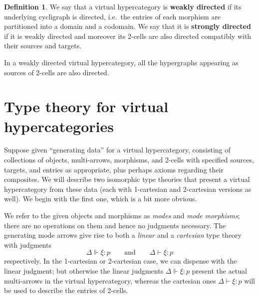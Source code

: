 \documentclass{article}
\theoremstyle{definition}
\newtheorem{defn}[thm]{Definition}
\theoremstyle{remark}
\let\types\vdash
\let\Types\Vdash
\begin{document}
\begin{defn}
  We say that a virtual hypercategory is \textbf{weakly directed} if its underlying cycligraph is directed, i.e.\ the entries of each morphism are partitioned into a domain and a codomain.
  We say that it is \textbf{strongly directed} if it is weakly directed and moreover its 2-cells are also directed compatibly with their sources and targets.
\end{defn}

In a weakly directed virtual hypercategory, all the hypergraphs appearing as sources of 2-cells are also directed.




\section{Type theory for virtual hypercategories}
\label{sec:type-theory}

Suppose given ``generating data'' for a virtual hypercategory, consisting of collections of objects, multi-arrows, morphisms, and 2-cells with specified sources, targets, and entries as appropriate, plus perhaps axioms regarding their composites.
We will describe two isomorphic type theories that present a virtual hypercategory from these data (each with 1-cartesian and 2-cartesian versions as well).
We begin with the first one, which is a bit more obvious.

We refer to the given objects and morphisms as \emph{modes} and \emph{mode morphisms}; there are no operations on them and hence no judgments necessary.
The generating mode arrows give rise to both a \emph{linear} and a \emph{cartesian} type theory with judgments
\[ \Delta \Types \xi:p \qquad\text{and}\qquad \Delta \types \xi:p \]
respectively.
In the 1-cartesian or 2-cartesian case, we can dispense with the linear judgment; but otherwise the linear judgments $\Delta \Types \xi:p$ present the actual multi-arrows in the virtual hypercategory, whereas the cartesian ones $\Delta \types \xi:p$ will be used to describe the entries of 2-cells.
\end{document}
